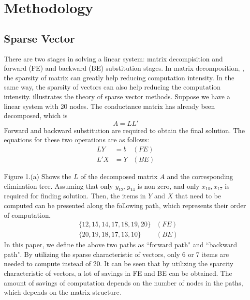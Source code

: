 \documentclass[conference]{IEEEtran}
\begin{document}
\section{Methodology}
  \subsection{Sparse Vector}
    There are two stages in solving a linear system: matrix decompisition and forward (FE) and backward (BE) substitution stages. In matrix 
decomposition,
, the sparsity of matrix can greatly help reducing computation intensity. In the same way, the sparsity of vectors can also help reducing
the computation intensity. \cite{Tinney} illustrates the theory of sparse vector methods. Suppose we have a linear system with 20 nodes.
The conductance matrix has already been decomposed, which is 
\begin{equation}
	A=LL'\label{eq3.1}
\end{equation}
Forward and backward substitution are required to obtain the final solution. The equations for these two operations are as follows:
\begin{align}
	LY &=b  &(FE)\label{eq3.2}\\
	L'X &= Y&(BE)\label{eq3.3}
\end{align}

Figure 1.(a) Shows the $L$ of the decomposed matrix $A$ and the corresponding elimination tree. Assuming that only $y_{12}, y_{14}$ is 
non-zero, and only $x_{10},x_{17}$ is required for finding solution. Then, the items in $Y$ and $X$ that need to be computed can be 
presented along the following path, which represents their order of computation.
\begin{align}
&\{12, 15, 14, 17, 18, 19, 20\} &(FE)\label{eq3.4}\\
&\{20, 19, 18, 17, 13, 10\}&(BE)\label{eq3.5}
\end{align}
In this paper, we define the above two paths as ``forward path" and ``backward path". By utilizing the sparse characteristic of vectors,
only 6 or 7 items are needed to compute instead of 20. It can be seen that by utilizing the sparcity characteristic of vectors, a lot of
savings in FE and BE can be obtained. The amount of savings of computation depends on the number of nodes in the paths, which depends on 
the matrix structure. 
 
\end{document}
